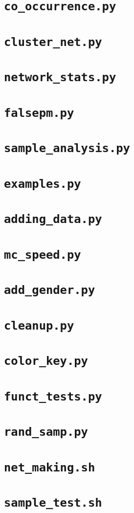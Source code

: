 \documentclass[10pt]{article}
\theoremstyle{definition}
\numberwithin{theorem}{section}
\numberwithin{definition}{section}
\numberwithin{lemma}{section}
\numberwithin{corollary}{section}
\numberwithin{clm}{section}
\numberwithin{rmk}{section}
\begin{document}
\cprotect \section{\verb|co_occurrence.py|}

\cprotect \section{\verb|cluster_net.py|}

\cprotect \section{\verb|network_stats.py|}

\cprotect \section{\verb|falsepm.py|}

\cprotect \section{\verb|sample_analysis.py|}

\cprotect \section{\verb|examples.py|}

\cprotect \section{\verb|adding_data.py|}

\cprotect \section{\verb|mc_speed.py|}

\cprotect \section{\verb|add_gender.py|}

\cprotect \section{\verb|cleanup.py|}

\cprotect \section{\verb|color_key.py|}

\cprotect \section{\verb|funct_tests.py|}

\cprotect \section{\verb|rand_samp.py|}

\cprotect \section{\verb|net_making.sh|}

\cprotect \section{\verb|sample_test.sh|}



\end{document}
